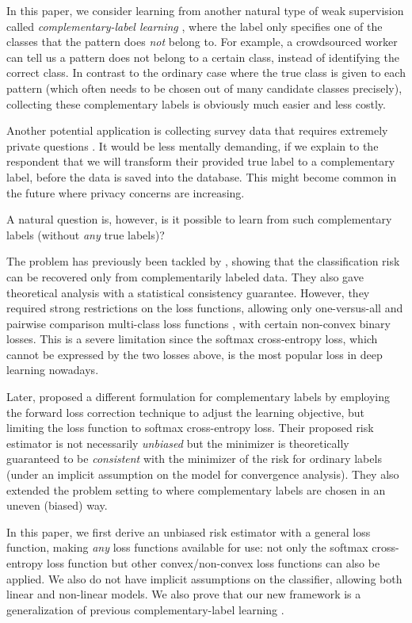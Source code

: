 \documentclass{article}
\begin{document}
In this paper, we consider learning from another natural type of weak supervision called \emph{complementary-label learning} \citep{ishida17nips,yu17eccv}, where the label only specifies one of the classes that the pattern does \emph{not} belong to.  For example, a crowdsourced worker can tell us a pattern does not belong to a certain class, instead of identifying the correct class.
In contrast to the ordinary case where the true class is given to each pattern (which often needs to be chosen out of many candidate classes precisely), collecting these complementary labels is obviously much easier and less costly.

Another potential application is collecting survey data that requires extremely private questions \citep{ishida17nips}.  It would be less mentally demanding, if we explain to the respondent that we will transform their provided true label to a complementary label, before the data is saved into the database. This might become common in the future where privacy concerns are increasing.

A natural question is, however, is it possible to learn from such complementary labels (without \emph{any} true labels)?

The problem has previously been tackled by \citet{ishida17nips},
showing that the classification risk can be recovered only from complementarily labeled data.
They also gave theoretical analysis with a statistical consistency guarantee.
However, they required strong restrictions on the loss functions, allowing only one-versus-all and pairwise comparison multi-class loss functions \citep{ova}, with certain non-convex binary losses.
This is a severe limitation since the softmax cross-entropy loss, which cannot be expressed by the two losses above, is the most popular loss in deep learning nowadays.

Later, \citet{yu17eccv} proposed a different formulation for complementary labels by employing the forward loss correction technique \citep{patrini17cvpr} to adjust the learning objective, but limiting the loss function to softmax cross-entropy loss.
Their proposed risk estimator is not necessarily \emph{unbiased} but the minimizer is theoretically guaranteed to be \emph{consistent} with the minimizer of the risk for ordinary labels (under an implicit assumption on the model for convergence analysis).
They also extended the problem setting to where complementary labels are chosen in an uneven (biased) way.

In this paper, we first derive an unbiased risk estimator with a general loss function, making \emph{any} loss functions available for use: not only the softmax cross-entropy loss function but other convex/non-convex loss functions can also be applied. We also do not have implicit assumptions on the classifier, allowing both linear and non-linear models.
We also prove that our new framework is a generalization of previous complementary-label learning \citep{ishida17nips}.
\end{document}
